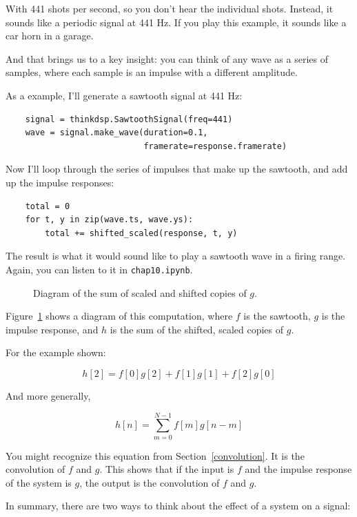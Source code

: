 \documentclass[12pt]{book}
\begin{document}
With 441 shots per second,
so you don't hear the individual shots.  Instead, it sounds
like a periodic signal at 441 Hz.  If you play this example, it
sounds like a car horn in a garage.

And that brings us to a key insight: you can think of any wave as a
series of samples, where each sample is an impulse with a different
amplitude.

As a example, I'll generate a sawtooth signal at 441 Hz:

\begin{verbatim}
    signal = thinkdsp.SawtoothSignal(freq=441)
    wave = signal.make_wave(duration=0.1,
                            framerate=response.framerate)
\end{verbatim}

Now I'll loop through the series of impulses that make up the
sawtooth, and add up the impulse responses:

\begin{verbatim}
    total = 0
    for t, y in zip(wave.ts, wave.ys):
        total += shifted_scaled(response, t, y)
\end{verbatim}

The result is what it would sound like to play a sawtooth wave in a
firing range.  Again, you can listen to it in {\tt chap10.ipynb}.

\begin{figure}

\caption{Diagram of the sum of scaled and shifted copies of $g$.}
\label{fig.convolution}
\end{figure}

Figure~\ref{fig.convolution} shows a diagram of this computation,
where $f$ is the sawtooth, $g$ is the impulse response, and $h$
is the sum of the shifted, scaled copies of $g$.

For the example shown:

\[ h[2] = f[0]g[2] + f[1]g[1] + f[2]g[0]  \]

And more generally,

\[ h[n] = \sum_{m=0}^{N-1} f[m] g[n-m]  \]

You might recognize this equation from Section~\ref{convolution}.  It
is the convolution of $f$ and $g$.  This shows that if the input is $f$
and the impulse response of the system is $g$, the output is the
convolution of $f$ and $g$.

In summary, there are two ways to think about the effect of a system
on a signal:
\end{document}

